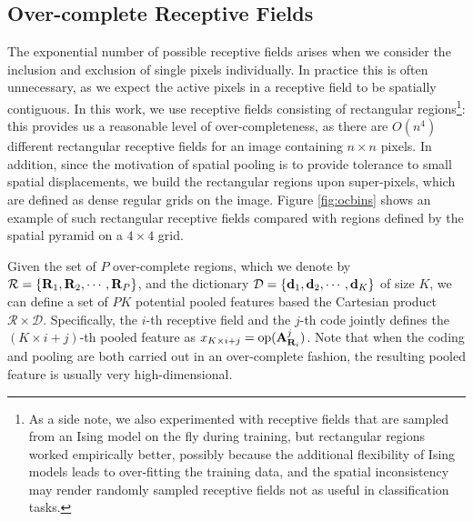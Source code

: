 \subsection{Over-complete Receptive Fields}
The exponential number of possible receptive fields arises when we consider the inclusion and exclusion of single pixels individually. In practice this is often unnecessary, as we expect the active pixels in a receptive field to be spatially contiguous. In this work, we use receptive fields consisting of rectangular regions\footnote{As a side note, we also experimented with receptive fields that are sampled from an Ising model on the fly during training, but rectangular regions worked empirically better, possibly because the additional flexibility of Ising models leads to over-fitting the training data, and the spatial inconsistency may render randomly sampled receptive fields not as useful in classification tasks.}: this provides us a reasonable level of over-completeness, as there are $O(n^4)$ different rectangular receptive fields for an image containing $n\times n$ pixels. In addition, since the motivation of spatial pooling is to provide tolerance to small spatial displacements, we build the rectangular regions upon super-pixels, which are defined as dense regular grids on the image. Figure \ref{fig:ocbins} shows an example of such rectangular receptive fields compared with regions defined by the spatial pyramid on a $4\times4$ grid.

Given the set of $P$ over-complete regions, which we denote by $\mathcal{R} = \{\mathbf{R}_{1},\mathbf{R}_{2},\cdots,\mathbf{R}_{P}\}$, and the dictionary $\mathcal{D} = \{\mathbf{d}_1,\mathbf{d}_2,\cdots,\mathbf{d}_K\}$ of size $K$, we can define a set of $PK$ potential pooled features based the Cartesian product $\mathcal{R}\times\mathcal{D}$. Specifically, the $i$-th receptive field and the $j$-th code jointly defines the $(K\times i + j)$-th pooled feature as $x_{K\times i + j} = \operatorname{op} (\mathbf{A}_{\mathbf{R}_i}^{j})$. Note that when the coding and pooling are both carried out in an over-complete fashion, the resulting pooled feature is usually very high-dimensional.

